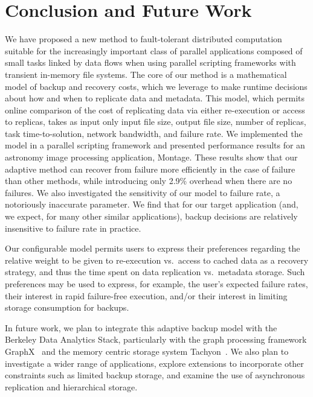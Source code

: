 \documentclass{sig-alternate}
\newcommand{\zhaonote}[1]{{\textcolor{cyan}    { ***Zhao:      #1 }}}
\newcommand{\zhaonote}[1]{}
\begin{document}
\section{Conclusion and Future Work}
\label{sec:Con}
We have proposed a new method to fault-tolerant distributed computation suitable for the increasingly important class of parallel applications composed of small tasks linked by data flows when using parallel scripting frameworks with transient in-memory file systems. %
The core of our method is a mathematical model of backup and recovery costs, which we leverage to make runtime decisions about how and when to replicate data and metadata. This model, which permits online comparison of the cost of replicating data via either re-execution or access to replicas, takes as input only input file size, output file size, number of replicas, task time-to-solution, network bandwidth, and failure rate.
We implemented the model in a parallel scripting framework and presented performance results for an astronomy image processing application, Montage.
These results show that our adaptive method can recover from failure more efficiently in the case of failure than other methods, while introducing only 2.9\% overhead when there are no failures. We also investigated the sensitivity of our model to failure rate, a notoriously inaccurate parameter. We find that for our target application (and, we expect, for many other similar applications), backup decisions are relatively insensitive to failure rate in practice.

Our configurable model permits users to express their preferences regarding the relative weight to be given to re-execution vs.\ access to cached data as a recovery strategy,
and thus the time spent on data replication vs.\ metadata storage. Such preferences may be used to express, for example, the user's expected failure rates, their interest
in rapid failure-free execution, and/or their interest in limiting storage consumption for backups.

In future work, we plan to integrate this adaptive backup model with the Berkeley Data Analytics Stack, particularly with
the graph processing framework GraphX~\cite{graphx2014} and the memory centric storage system Tachyon~\cite{tachyon2014}.
We also plan to investigate a wider range of applications, explore extensions to incorporate other constraints such as limited backup storage,
and examine the use of asynchronous replication and hierarchical storage.





\end{document}
